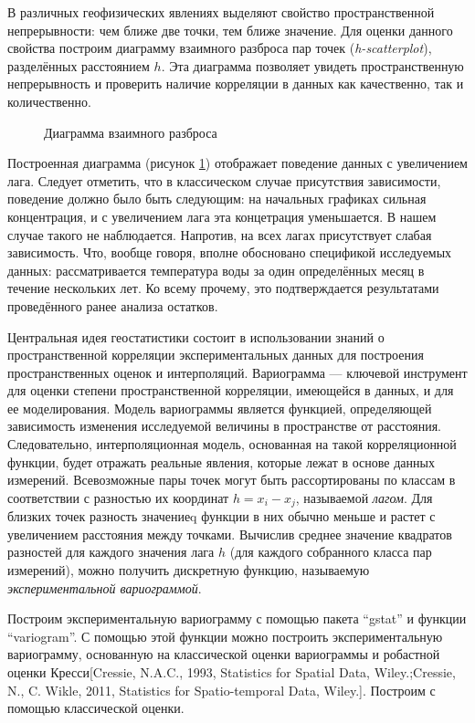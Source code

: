 В различных геофизических явлениях выделяют свойство пространственной непрерывности: чем ближе две точки, тем ближе значение. Для оценки данного свойства построим диаграмму взаимного разброса пар точек (\textit{h-scatterplot}), разделённых расстоянием $h$. Эта диаграмма позволяет увидеть пространственную непрерывность и проверить наличие корреляции в данных как качественно, так и количественно.

\begin{figure}[ht]
\caption{Диаграмма взаимного разброса}
\label{img:h-scatter}
\end{figure}

 Построенная диаграмма (рисунок \ref{img:h-scatter}) отображает поведение данных с увеличением лага. Следует отметить, что в классическом случае присутствия зависимости, поведение должно было быть следующим: на начальных графиках сильная концентрация, и с увеличением лага эта концетрация уменьшается. В нашем случае такого не наблюдается. Напротив, на всех лагах присутствует слабая зависимость. Что, вообще говоря, вполне обосновано спецификой исследуемых данных: рассматривается температура воды за один определённых месяц в течение нескольких лет. Ко всему прочему, это подтверждается результатами проведённого ранее анализа остатков.

Центральная идея геостатистики состоит в использовании знаний о пространственной корреляции экспериментальных данных для построения пространственных оценок и интерполяций. Вариограмма --- ключевой инструмент для оценки степени пространственной корреляции, имеющейся в данных, и для ее моделирования. Модель вариограммы является функцией, определяющей зависимость изменения исследуемой величины в пространстве от расстояния. Следовательно, интерполяционная модель, основанная на такой корреляционной функции, будет отражать реальные явления, которые лежат в основе данных измерений. Всевозможные пары точек могут быть рассортированы по классам в соответствии с разностью их координат $h = x_i - x_j$, называемой \textit{лагом}. Для близких точек разность значениеq функции в них обычно меньше и растет с увеличением расстояния между точками. Вычислив среднее значение квадратов разностей для каждого значения лага $h$ (для каждого собранного класса пар измерений), можно получить дискретную функцию, называемую \textit{экспериментальной вариограммой}.

Построим экспериментальную вариограмму с помощью пакета ``gstat'' и функции ``variogram''. С помощью этой функции можно построить экспериментальную вариограмму, основанную на классической оценки вариограммы и робастной оценки Кресси[Cressie, N.A.C., 1993, Statistics for Spatial Data, Wiley.;Cressie, N., C. Wikle, 2011, Statistics for Spatio-temporal Data, Wiley.]. Построим с помощью классической оценки.

